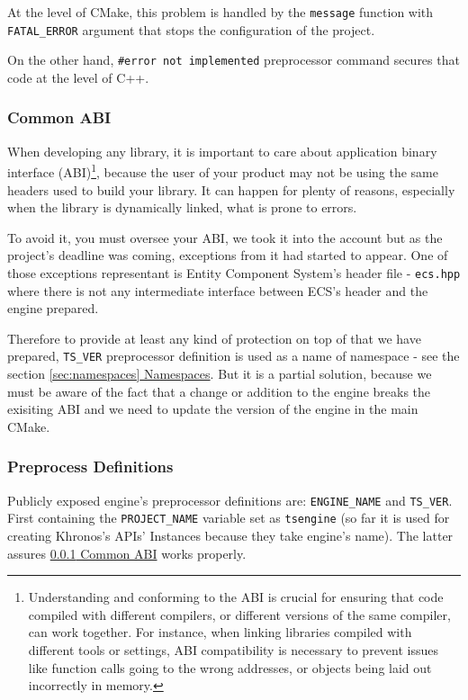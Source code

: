 At the level of CMake, this problem is handled by the \texttt{message} function with \texttt{FATAL\_ERROR} argument that stops the configuration of the project.

On the other hand, \texttt{\#error not implemented} preprocessor command secures that code at the level of C++.

\subsubsection{Common ABI}
\label{sec:build_abi}
\hspace{\parindent} When developing any library, it is important to care about application binary interface (ABI)\footnote{Understanding and conforming to the ABI is crucial for ensuring that code compiled with different compilers, or different versions of the same compiler, can work together. For instance, when linking libraries compiled with different tools or settings, ABI compatibility is necessary to prevent issues like function calls going to the wrong addresses, or objects being laid out incorrectly in memory.}, because the user of your product may not be using the same headers used to build your library. It can happen for plenty of reasons, especially when the library is dynamically linked, what is prone to errors.

To avoid it, you must oversee your ABI, we took it into the account but as the project's deadline was coming, exceptions from it had started to appear. One of those exceptions representant is Entity Component System's header file - \texttt{ecs.hpp} where there is not any intermediate interface between ECS's header and the engine prepared.

Therefore to provide at least any kind of protection on top of that we have prepared, \texttt{TS\_VER} preprocessor definition is used as a name of namespace - see the section \hyperref[sec:namespaces]{\ref*{sec:namespaces} Namespaces}. But it is a partial solution, because we must be aware of the fact that a change or addition to the engine breaks the exisiting ABI and we need to update the version of the engine in the main CMake. 

\subsubsection{Preprocess Definitions}
\hspace{\parindent} Publicly exposed engine's preprocessor definitions are: \texttt{ENGINE\_NAME} and \texttt{TS\_VER}.\\ First containing the \texttt{PROJECT\_NAME} variable set as \texttt{tsengine} (so far it is used for creating Khronos's APIs' Instances because they take engine's name). The latter assures \hyperref[sec:build_abi]{\ref{sec:build_abi} Common ABI} works properly.

